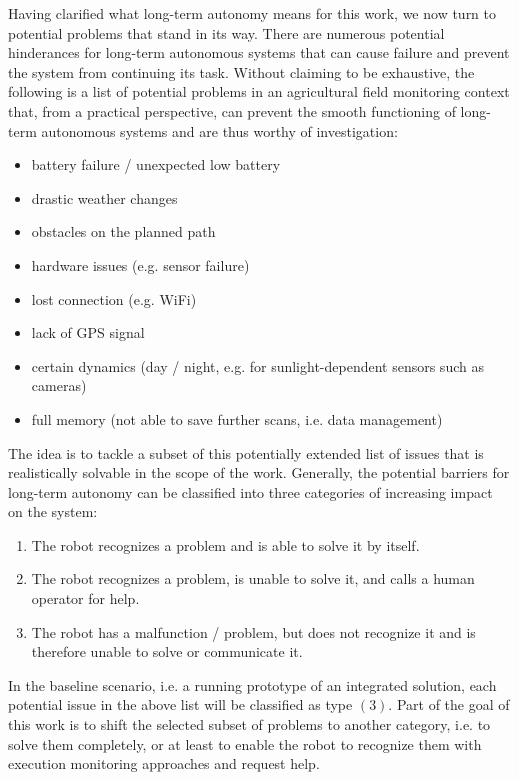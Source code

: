 \documentclass[english, master, expose, utf8]{base/thesis_KBS}
\begin{document}
Having clarified what long-term autonomy means for this work, we now turn to potential problems that stand in its way.
There are numerous potential hinderances for long-term autonomous systems that can cause failure and prevent the system from continuing its task.
Without claiming to be exhaustive, the following is a list of potential problems in an agricultural field monitoring context that, from a practical perspective,
can prevent the smooth functioning of long-term autonomous systems and are thus worthy of investigation:
\begin{itemize}
    \item battery failure / unexpected low battery
    \item drastic weather changes
    \item obstacles on the planned path
    \item hardware issues (e.g. sensor failure)
    \item lost connection (e.g. WiFi)
    \item lack of GPS signal
    \item certain dynamics (day / night, e.g. for sunlight-dependent sensors such as cameras)
    \item full memory (not able to save further scans, i.e. data management)
\end{itemize}
The idea is to tackle a subset of this potentially extended list of issues that is realistically solvable in the scope of the work.
Generally, the potential barriers for long-term autonomy can be classified into three categories of increasing impact on the system:
\begin{enumerate}
    \item The robot recognizes a problem and is able to solve it by itself.
    \item The robot recognizes a problem, is unable to solve it, and calls a human operator for help.
    \item The robot has a malfunction / problem, but does not recognize it and is therefore unable to solve or communicate it.
\end{enumerate}
In the baseline scenario, i.e. a running prototype of an integrated solution, each potential issue in the above list will be classified as type $(3)$.
Part of the goal of this work is to shift the selected subset of problems to another category, i.e. to solve them completely, 
or at least to enable the robot to recognize them with execution monitoring approaches and request help.
\end{document}
